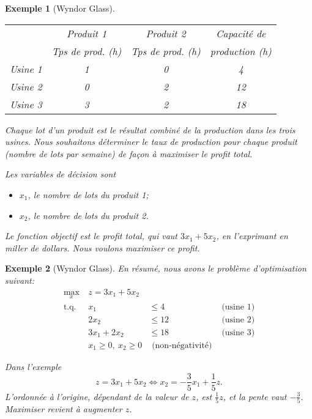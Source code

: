 \documentclass[usepdftitle=false]{beamer}
\newtheorem{exe}{Exemple}
\begin{document}
\begin{frame}

\begin{exe}[Wyndor Glass]

\begin{center}
\begin{tabular}{|c|c|c|c|}
\hline
& Produit 1 & Produit 2 & Capacité de \\
& Tps de prod. (h) & Tps de prod. (h)& production (h)\\
\hline
Usine 1 & 1 & 0 & 4 \\
\hline
Usine 2 & 0 & 2 & 12 \\
\hline
Usine 3 & 3 & 2 & 18 \\
\hline
\end{tabular}
\end{center}

Chaque lot d'un produit est le résultat combiné de la production dans les trois usines.
Nous souhaitons déterminer le taux de production pour chaque produit (nombre de lots par semaine) de façon à maximiser le profit total.

Les variables de décision sont
\begin{itemize}
\item
$x_1$, le nombre de lots du produit 1;
\item
$x_2$, le nombre de lots du produit 2.
\end{itemize}
Le fonction objectif est le profit total, qui vaut $3x_1 +5x_2$, en l'exprimant en miller de dollars. Nous voulons maximiser ce profit.
\end{exe}

\end{frame}

\begin{frame}

\begin{exe}[Wyndor Glass]
En résumé, nous avons le problème d'optimisation suivant:
\begin{align*}
\max_x\ & z = 3x_1 + 5x_2 \\
\mbox{t.q. } & x_1\qquad & \leq 4 & \mbox{ (usine 1)} \\
& 2x_2 & \leq 12 & \mbox{ (usine 2)} \\
& 3x_1 + 2x_2 & \leq 18 & \mbox{ (usine 3)} \\
& x_1 \geq 0,\ x_2 \geq 0 & \mbox{ (non-négativité)}
\end{align*}

Dans l'exemple
\[
z = 3x_1+5x_2 \Leftrightarrow x_2 = -\frac{3}{5}x_1 + \frac{1}{5}z.
\]
L'ordonnée à l'origine, dépendant de la valeur de $z$, est $\frac{1}{5}z$, et la pente vaut $-\frac{3}{5}$.
Maximiser revient à augmenter $z$.
\end{exe}

\end{frame}
\end{document}
